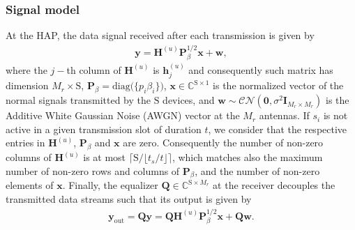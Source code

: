 \documentclass[10pt,journal,a4paper]{IEEEtran}
\begin{document}
	\subsubsection{Signal model}
	At the HAP, the data signal received after each transmission is given by
	\begin{align}
	\mathbf{y}=\mathbf{H}^{(u)}\mathbf{P}_{\!\beta}^{1/2}\mathbf{x}+\mathbf{w},\label{y}
	\end{align}
	where the $j-$th column of $\mathbf{H}^{(u)}$ is $\mathbf{h}_j^{(u)}$ and consequently such matrix has dimension $M_r\times \mathrm{S}$, $\mathbf{P}_{\!\beta}=\mathrm{diag}\big(\{p_i\beta_i\}\big)$, $\mathbf{x}\in\mathbb{C}^{\mathrm{S\times 1}}$ is the normalized vector of the normal signals transmitted by the $\mathrm{S}$ devices, and $\mathbf{w}\sim\mathcal{CN}(\mathbf{0},\sigma^2\mathbf{I}_{M_r\times M_r})$ is the Additive White Gaussian Noise (AWGN) vector at the $M_r$ antennas. 
	If $s_i$ is not active in a given transmission slot of duration $t$, we consider that the respective entries in $\mathbf{H}^{(u)}$, $\mathbf{P}_{\!\beta}$ and $\mathbf{x}$ are zero. Consequently the number of non-zero columns of $\mathbf{H}^{(u)}$ is at most $\lceil\mathrm{S}/\lfloor t_s/t\rfloor\rceil$, which matches also the maximum number of non-zero rows and columns of $\mathbf{P}_{\!\beta}$, and the number of non-zero elements of $\mathbf{x}$. 
	Finally, the equalizer $\mathbf{Q}\in\mathbb{C}^{\mathrm{S}\times M_r}$ at the receiver decouples the transmitted data streams such that its output is given by
	\begin{align}
	\mathbf{y}_{\mathrm{out}}=\mathbf{Q}\mathbf{y}=\mathbf{Q}\mathbf{H}^{(u)}\mathbf{P}_{\!\beta}^{1/2}\mathbf{x}+\mathbf{Q}\mathbf{w}.\label{yout}
	\end{align}
\end{document}
